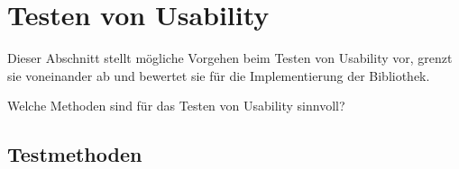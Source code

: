 \section{Testen von Usability}
\label{usability_testing}

Dieser Abschnitt stellt mögliche Vorgehen beim Testen von Usability vor, grenzt sie voneinander ab und bewertet sie für die Implementierung der Bibliothek. 

Welche Methoden sind für das Testen von Usability sinnvoll?

\subsection{Testmethoden}


\cite{usabilityblog_wasBeachten}

\cite{usabilityblog_eResult}